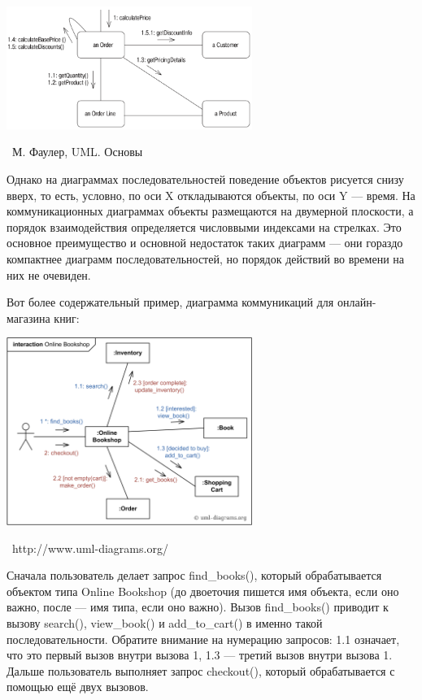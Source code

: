 \documentclass[a5paper]{article}
\newcommand{\attribution}[1] {
	\vspace{-5mm}\begin{flushright}\begin{scriptsize}%
	{\textcopyright\, #1}\end{scriptsize}\end{flushright}
}
\begin{document}
\begin{center}
	\includegraphics[width=0.6\textwidth]{communicationDiagram.png}
	\attribution{М. Фаулер, UML. Основы}
\end{center}

Однако на диаграммах последовательностей поведение объектов рисуется снизу вверх, то есть, условно, по оси X откладываются объекты, по оси Y --- время. На коммуникационных диаграммах объекты размещаются на двумерной плоскости, а порядок взаимодействия определяется числоввыми индексами на стрелках. Это основное преимущество и основной недостаток таких диаграмм --- они гораздо компактнее диаграмм последовательностей, но порядок действий во времени на них не очевиден.

Вот более содержательный пример, диаграмма коммуникаций для онлайн-магазина книг:

\begin{center}
	\includegraphics[width=0.6\textwidth]{communicationDiagramExample.png}
	\attribution{http://www.uml-diagrams.org/}
\end{center}

Сначала пользователь делает запрос find\_books(), который обрабатывается объектом типа Online Bookshop (до двоеточия пишется имя объекта, если оно важно, после --- имя типа, если оно важно). Вызов find\_books() приводит к вызову search(), view\_book() и add\_to\_cart() в именно такой последовательности. Обратите внимание на нумерацию запросов: 1.1 означает, что это первый вызов внутри вызова 1, 1.3 --- третий вызов внутри вызова 1. Дальше пользователь выполняет запрос checkout(), который обрабатывается с помощью ещё двух вызовов.
\end{document}
